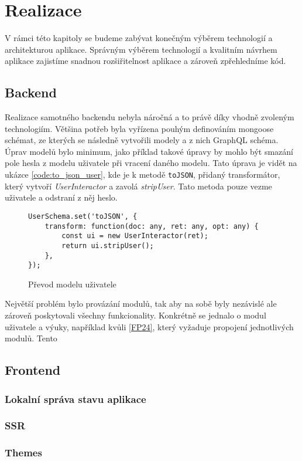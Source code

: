 \chapter{Realizace}
\label{ch:implementation}
V rámci této kapitoly se budeme zabývat konečným výběrem technologií a architekturou aplikace. Správným výběrem technologií a kvalitním návrhem aplikace zajistíme snadnou rozšiřitelnost aplikace a zároveň zpřehledníme kód.







\section{Backend}
\label{sc:backend}
Realizace samotného backendu nebyla náročná a to právě díky vhodně zvoleným technologiím. Většina potřeb byla vyřízena pouhým definováním mongoose schémat, ze kterých se následně vytvořili modely a z nich GraphQL schéma. Úprav modelů bylo minimum, jako příklad takové úpravy by mohlo být smazání pole hesla z modelu uživatele při vracení daného modelu. Tato úprava je vidět na ukázce \ref{code:to_json_user}, kde je k metodě \texttt{toJSON}, přidaný transformátor, který vytvoří \emph{UserInteractor} a zavolá \emph{stripUser}. Tato metoda pouze vezme uživatele a odstraní z něj heslo.

\begin{figure}[h!]
    \centering
    \begin{verbatim}
UserSchema.set('toJSON', {
    transform: function(doc: any, ret: any, opt: any) {
        const ui = new UserInteractor(ret);
        return ui.stripUser();
    },
});
    \end{verbatim}
    \caption{Převod modelu uživatele}
    \label{code:to_user_model}
\end{figure}

Největší problém bylo provázání modulů, tak aby na sobě byly nezávislé ale zároveň poskytovali všechny funkcionality. Konkrétně se jednalo o modul uživatele a výuky, například kvůli \ref{FP24}, který vyžaduje propojení jednotlivých modulů. Tento

\section{Frontend}
\label{sc:frontend}

\subsection{Lokalní správa stavu aplikace}
\label{ss:local_state_management}

\subsection{SSR}
\label{ss:ssr}

\subsection{Themes}
\label{ss:themes}


